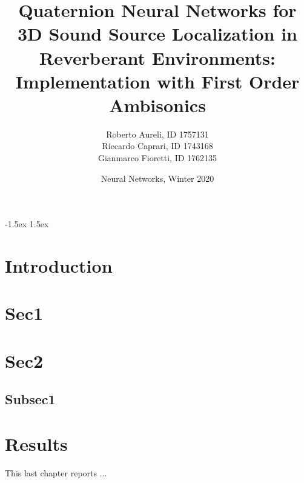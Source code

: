 \documentclass[11pt]{article}
\title{Quaternion Neural Networks for 3D Sound Source Localization in Reverberant Environments: Implementation with First Order Ambisonics}
\author{Roberto Aureli, ID 1757131\\
		Riccardo Caprari, ID 1743168\\
		Gianmarco Fioretti, ID 1762135}
\date{Neural Networks, Winter 2020}
\begin{document}
\maketitle

\vspace{10px}

\openup -1.5ex
\tableofcontents
\openup 1.5ex

\newpage
\section{Introduction}\label{cha:intro}



\section{Sec1}\label{cha:data}


\newpage
\section{Sec2}\label{cha:cnn}


\subsection{Subsec1}\label{subs:rn}



\section{Results}\label{cha:res}

This last chapter reports ...
\end{document}

